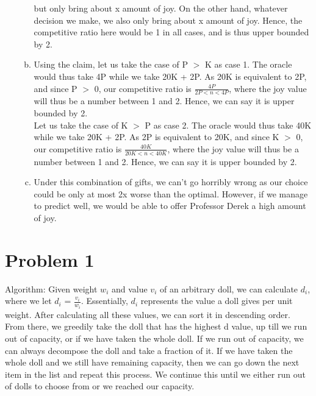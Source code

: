 \documentclass[12pt,letterpaper]{article}
\begin{document}
\begin{enumerate}
\begin{enumerate}[a)]
        but only bring about x amount of joy.
        On the other hand, whatever decision we make, we also only bring about x amount of joy.
        Hence, the competitive ratio here would be 1 in all cases, and is thus upper bounded by 2.
      \item 
        Using the claim, let us take the case of P $>$ K as case 1.
        The oracle would thus take 4P while we take 20K + 2P.
        As 20K is equivalent to 2P, and since P $>$ 0, our competitive ratio is $\frac{4P}{2P < n < 4P}$,
        where the joy value will thus be a number between 1 and 2. 
        Hence, we can say it is upper bounded by 2. \\
        Let us take the case of K $>$ P as case 2.
        The oracle would thus take 40K while we take 20K + 2P.
        As 2P is equivalent to 20K, and since K $>$ 0, our competitive ratio is $\frac{40K}{20K < n < 40K}$,
        where the joy value will thus be a number between 1 and 2. 
        Hence, we can say it is upper bounded by 2.
      \item
        Under this combination of gifts, we can't go horribly wrong as our 
        choice could be only at most 2x worse than the optimal.
        However, if we manage to predict well, we would be able to offer Professor Derek a high amount of joy.
    \end{enumerate}
\end{enumerate}

\newpage

\section*{Problem 1}
Algorithm:
Given weight $w_{i}$ and value $v_{i}$ of an arbitrary doll, we can calculate $d_{i}$,
where we let $d_{i}$ = $\frac{v_{i}}{w_{i}}$.
Essentially, $d_{i}$ represents the value a doll gives per unit weight. 
After calculating all these values, we can sort it in descending order.
From there, we greedily take the doll that has the highest d value, 
up till we run out of capacity, or if we have taken the whole doll.
If we run out of capacity, we can always decompose the doll and take a fraction of it.
If we have taken the whole doll and we still have remaining capacity, 
then we can go down the next item in the list and repeat this process.
We continue this until we either run out of dolls to choose from or we reached our capacity. \\
\end{document}
